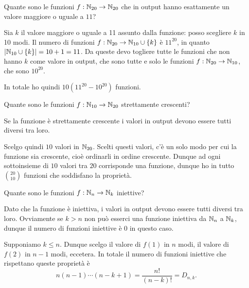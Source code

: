 \begin{example}
    Quante sono le funzioni $f : \mathbb{N}_{20} \to \mathbb{N}_{20}$ che in output hanno esattamente un valore maggiore o uguale a $11$?
\end{example}
\begin{solution}
    Sia $k$ il valore maggiore o uguale a 11 assunto dalla funzione: posso scegliere $k$ in 10 modi. Il numero di funzioni $f : \mathbb{N}_{20} \to \mathbb{N}_{10} \cup \{k\}$ è $11^{20}$, in quanto $\left|\mathbb{N}_{10} \cup \{k\}\right| = 10 + 1 = 11$. Da queste devo togliere tutte le funzioni che non hanno $k$ come valore in output, che sono tutte e solo le funzioni $f : \mathbb{N}_{20} \to \mathbb{N}_{10}$, che sono $10^{20}$.

    In totale ho quindi $10(11^{20} - 10^{20})$ funzioni.
\end{solution}

\begin{example}
    Quante sono le funzioni $f : \mathbb{N}_{10} \to \mathbb{N}_{20}$ strettamente crescenti?
\end{example}
\begin{solution}
    Se la funzione è strettamente crescente i valori in output devono essere tutti diversi tra loro.

    Scelgo quindi $10$ valori in $\mathbb{N}_{20}$. Scelti questi valori, c'è un solo modo per cui la funzione sia crescente, cioè ordinarli in ordine crescente. Dunque ad ogni sottoinsieme di $10$ valori tra $20$ corrisponde una funzione, dunque ho in tutto $\binom{20}{10}$ funzioni che soddisfano la proprietà.
\end{solution}

\begin{example}
    Quante sono le funzioni $f : \mathbb{N}_n \to \mathbb{N}_k$ iniettive?
\end{example}
\begin{solution}
    Dato che la funzione è iniettiva, i valori in output devono essere tutti diversi tra loro. Ovviamente se $k > n$ non può esserci una funzione iniettiva da $\mathbb{N}_n$ a $\mathbb{N}_k$, dunque il numero di funzioni iniettive è 0 in questo caso.

    Supponiamo $k \leq n$. Dunque scelgo il valore di $f(1)$ in $n$ modi, il valore di $f(2)$ in $n-1$ modi, eccetera. In totale il numero di funzioni iniettive che rispettano queste proprietà è \[
        n(n-1) \cdots (n-k+1) = \frac{n!}{(n-k)!} = D_{n, k}.    
    \]
\end{solution}

